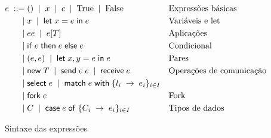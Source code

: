 \begin{figure}[t]
  \begin{align*}
    e \; ::= \; & () \;\mid\; x \;\mid\; c \;\mid\; \text{True} \;\mid\; \text{False} && \text{Expressões básicas}\\
    \;\mid\; & x \;\mid\; \mathsf{let} \; x = e \; \mathsf{in} \; e && \text{Variáveis e let}\\
    \;\mid\; & ee \;\mid\; e[T] && \text{Aplicações}\\
    \;\mid\; & \mathsf{if}\;e\;\mathsf{then}\;e\;\mathsf{else} \; e && \text{Condicional}\\
    \;\mid\; & (e,e) \;\mid\; \mathsf{let}\;x, y = e\;\mathsf{in}\;e && \text{Pares}\\
    \;\mid\; & \mathsf{new}\;T \;\mid\; \mathsf{send}\;e\; e \;\mid\; \mathsf{receive}\;e && \text{Operações de comunicação}\\
    \;\mid\; & \mathsf{select}\;e \;\mid\; \mathsf{match}\;e\;\mathsf{with}\;\{l_i\;\to\;e_i\}_{i\in I} \\
    \;\mid\; & \mathsf{fork}\;e  && \text{Fork}\\
    \;\mid\; & C \;\mid\; \mathsf{case}\;e\;\mathsf{of}\;\{C_i\;\to\;e_i\}_{i\in I} && \text{Tipos de dados}\\
  \end{align*}
  \hrulefill
  \caption{Sintaxe das expressões}
  \label{fig:expressions}
\end{figure}


